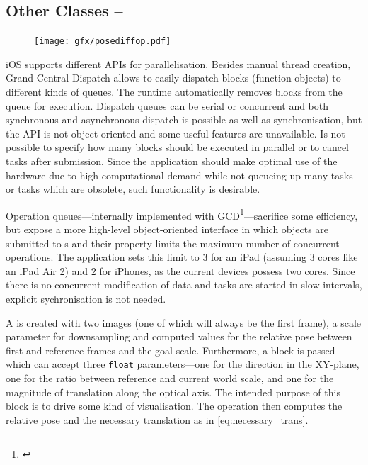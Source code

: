 \FloatBarrier

\subsection{Other Classes -- }

\begin{figure}
   \texttt{[image: gfx/posediffop.pdf]}
\end{figure}
iOS supports different APIs for parallelisation. Besides manual thread creation,
Grand Central Dispatch allows to easily dispatch blocks (function objects) to
different kinds of queues. The runtime automatically removes blocks from the
queue for execution. Dispatch queues can be serial or concurrent and both
synchronous and asynchronous dispatch is possible as well as synchronisation,
but the API is not object-oriented and some useful features are unavailable.  Is
not possible to specify how many blocks should be executed in parallel or to
cancel tasks after submission. Since the application should make optimal use of
the hardware due to high computational demand while not queueing up many tasks
or tasks which are obsolete, such functionality is desirable.

Operation queues---internally implemented with
GCD\footnote{\citep{nsopgcd}}---sacrifice some efficiency, but expose a more
high-level object-oriented interface in which  objects are
submitted to s and their
 property limits the maximum number of
concurrent operations. The application sets this limit to $3$ for an iPad
(assuming $3$ cores like an iPad Air 2) and $2$ for iPhones, as the current
devices possess two cores. Since there is no concurrent modification of data and
tasks are started in slow intervals, explicit sychronisation is not needed.

A  is created with two images (one of
which will always be the first frame), a scale parameter for downsampling and
computed values for the relative pose between first and reference frames and the
goal scale. Furthermore, a block is passed which can accept three \texttt{float}
parameters---one for the direction in the XY-plane, one for the ratio between
reference and current world scale, and one for the magnitude of translation along
the optical axis. The intended purpose of this block is to drive some kind of
visualisation. The operation then computes the relative pose and the necessary
translation as in \eqref{eq:necessary_trans}. 

